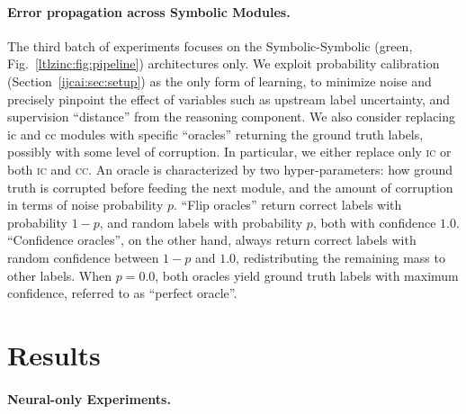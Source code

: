 \paragraph{Error propagation across Symbolic Modules.}
The third batch of experiments focuses on the Symbolic-Symbolic (green, Fig.~\ref{ltlzinc:fig:pipeline}) architectures only. We exploit probability calibration (Section~\ref{ijcai:sec:setup}) as the only form of learning, to minimize noise and precisely pinpoint the effect of variables such as upstream label uncertainty, and supervision ``distance'' from the reasoning component. We also consider replacing {\sc ic} and {\sc cc} modules with specific ``oracles'' returning the ground truth labels, possibly with some level of corruption. In particular, we either replace only \textsc{ic} or both \textsc{ic} and \textsc{cc}. %
%
An oracle is characterized by two hyper-parameters: how ground truth is corrupted before feeding the next module, and the amount of corruption in terms of noise probability $p$. ``Flip oracles'' return correct labels with probability $1-p$, and random labels with probability $p$, both with confidence $1.0$. ``Confidence oracles'', on the other hand, always return correct labels with random confidence between $1-p$ and $1.0$, redistributing the remaining mass to other labels.
When $p = 0.0$, both oracles yield ground truth labels with maximum confidence, referred to as ``perfect oracle''.
%
%
\section{Results}

\paragraph{Neural-only Experiments.}%

